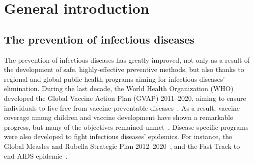 \chapter{General introduction} 
\label{Introduction} 


\section{The prevention of infectious diseases}
\label{Intro:Prevention}

The prevention of infectious diseases has greatly improved, not only as a result of the development of safe, highly-effective preventive %
methods, but also thanks to regional and global public health programs aiming for infectious diseases' elimination. During the last decade, the World Health Organization (WHO) developed the Global Vaccine Action Plan (GVAP) 2011--2020, aiming to ensure individuals to live free from vaccine-preventable diseases~\cite[]{GVAP_Review2020}. As a result, vaccine coverage among children and vaccine development have shown a remarkable progress, but many of the objectives remained unmet~\cite[]{GVAP_Review2020}. Disease-specific programs were also developed to fight infectious diseases' epidemics. For instance, the Global Measles%
and Rubella Strategic Plan 2012--2020~\cite[]{WHO_MR2012}, and the Fast Track to end AIDS epidemic~\cite[]{UNAIDS_EndAIDS2011}. 


